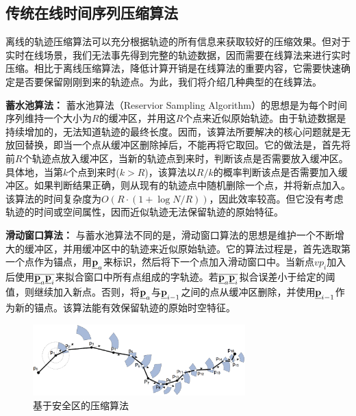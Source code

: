 \subsection{传统在线时间序列压缩算法}
离线的轨迹压缩算法可以充分根据轨迹的所有信息来获取较好的压缩效果。但对于实时在线场景，我们无法事先得到完整的轨迹数据，因而需要在线算法来进行实时压缩。相比于离线压缩算法，降低计算开销是在线算法的重要内容，它需要快速确定是否要保留刚刚到来的轨迹点。为此，我们将介绍几种典型的在线算法。

\textbf{蓄水池算法：}
蓄水池算法（Reservior Sampling Algorithm）\cite{Reservoir}的思想是为每个时间序列维持一个大小为$R$的缓冲区，并用这$R$个点来近似原始轨迹。由于轨迹数据是持续增加的，无法知道轨迹的最终长度。因而，该算法所要解决的核心问题就是无放回替换，即当一个点从缓冲区删除掉后，不能再将它取回。它的做法是，首先将前$R$个轨迹点放入缓冲区，当新的轨迹点到来时，判断该点是否需要放入缓冲区。具体地，当第$k$个点到来时($k>R$)，该算法以$R/k$的概率判断该点是否需要加入缓冲区。如果判断结果正确，则从现有的轨迹点中随机删除一个点，并将新点加入。该算法的时间复杂度为$O(R\cdot(1+\log N/R))$，因此效率较高。但它没有考虑轨迹的时间或空间属性，因而近似轨迹无法保留轨迹的原始特征。

\textbf{滑动窗口算法：}
与蓄水池算法不同的是，滑动窗口算法\cite{ICDMSiding,EDBTSliding}的思想是维护一个不断增大的缓冲区，并用缓冲区中的轨迹来近似原始轨迹。它的算法过程是，首先选取第一个点作为锚点，用$\emph{{\textbf{p}}}_a$来标识，然后将下一个点加入滑动窗口中。当新点$vp_{i}$加入后使用$\overline{\emph{{\textbf{p}}}_a \emph{{\textbf{p}}}_i}$来拟合窗口中所有点组成的字轨迹。若$\overline{\emph{{\textbf{p}}}_a \emph{{\textbf{p}}}_i}$拟合误差小于给定的阈值，则继续加入新点。否则，将$\emph{{\textbf{p}}}_a$与$\emph{{\textbf{p}}}_{i-1}$之间的点从缓冲区删除，并使用$\emph{{\textbf{p}}}_{i-1}$作为新的锚点。该算法能有效保留轨迹的原始时空特征。

\begin{figure}
	\centering
	\includegraphics[width=0.73\textwidth]{Fig/chapter2/safearea}
	\caption{基于安全区的压缩算法\cite{Zheng2011Computing}}
	\label{fig-chapter2-safeare}
\end{figure}

